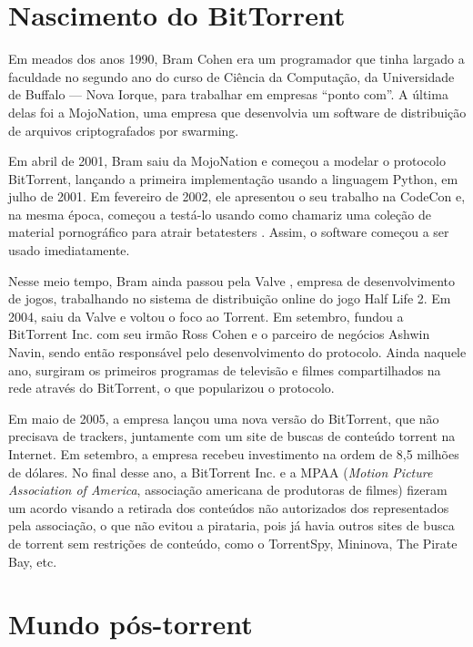 \section{Nascimento do BitTorrent}

Em meados dos anos 1990, Bram Cohen era um programador que tinha largado a faculdade no
segundo ano do curso de Ciência da Computação, da Universidade de Buffalo --- Nova
Iorque, para trabalhar em empresas ``ponto com''. A última delas foi a MojoNation, uma
empresa que desenvolvia um software de distribuição de arquivos criptografados por
\gls*{swarming}.

Em abril de 2001, Bram saiu da MojoNation e começou a modelar o protocolo BitTorrent,
lançando a primeira implementação usando a linguagem Python, em julho de 2001. Em
fevereiro de 2002, ele apresentou o seu trabalho na CodeCon \cite{site:codecon} e, na
mesma época, começou a testá-lo usando como chamariz uma coleção de material
pornográfico para atrair \glspl{betatester} \cite{site:bramcohen}. Assim, o software
começou a ser usado imediatamente.

Nesse meio tempo, Bram ainda passou pela Valve \cite{wiki:bramcohen}, empresa de
desenvolvimento de jogos, trabalhando no sistema de distribuição online do jogo Half
Life 2. Em 2004, saiu da Valve e voltou o foco ao Torrent. Em setembro, fundou a
BitTorrent Inc. com seu irmão Ross Cohen e o parceiro de negócios Ashwin Navin, sendo
então responsável pelo desenvolvimento do protocolo. Ainda naquele ano, surgiram os
primeiros programas de televisão e filmes compartilhados na rede através do BitTorrent,
o que popularizou o protocolo.

Em maio de 2005, a empresa lançou uma nova versão do BitTorrent, que não precisava de
\glspl{tracker}, juntamente com um site de buscas de conteúdo torrent na Internet. Em
setembro, a empresa recebeu investimento na ordem de 8,5 milhões de dólares. No final
desse ano, a BitTorrent Inc. e a MPAA (\emph{Motion Picture Association of America},
associação americana de produtoras de filmes) fizeram um acordo \cite{wiki:mpaa}
visando a retirada dos conteúdos não autorizados dos representados pela associação, o
que não evitou a pirataria, pois já havia outros sites de busca de torrent sem
restrições de conteúdo, como o TorrentSpy, Mininova, The Pirate Bay, etc.

\section{Mundo pós-torrent}

